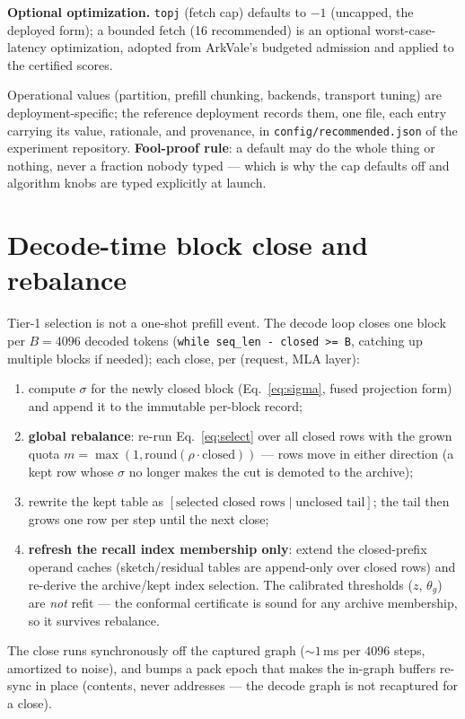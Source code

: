 \documentclass[11pt]{article}
\begin{document}
\textbf{Optional optimization.} \texttt{topj} (fetch cap) defaults to $-1$
(uncapped, the deployed form); a bounded fetch (16 recommended) is an
optional worst-case-latency optimization, adopted from ArkVale's budgeted
admission and applied to the certified scores.

Operational values (partition, prefill chunking, backends, transport tuning)
are deployment-specific; the reference deployment records them, one file,
each entry carrying its value, rationale, and provenance, in \texttt{config/recommended.json} of the
experiment repository. \textbf{Fool-proof rule}: a default may do the whole
thing or nothing, never a fraction nobody typed --- which is why the cap
defaults off and algorithm knobs are typed explicitly at launch.

\section{Decode-time block close and rebalance}\label{sec:close}

Tier-1 selection is not a one-shot prefill event. The decode loop closes one
block per $B=4096$ decoded tokens (\texttt{while seq\_len - closed >= B},
catching up multiple blocks if needed); each close, per (request, MLA layer):
\begin{enumerate}[itemsep=1pt]
\item compute $\sigma$ for the newly closed block (Eq.~\eqref{eq:sigma},
fused projection form) and append it to the immutable per-block record;
\item \textbf{global rebalance}: re-run Eq.~\eqref{eq:select} over all
$\mathrm{closed}$ rows with the grown quota $m=\max(1,\mathrm{round}(\rho\cdot\mathrm{closed}))$
--- rows move in either direction (a kept row whose $\sigma$ no longer makes
the cut is demoted to the archive);
\item rewrite the kept table as $[\text{selected closed rows} \;|\;
\text{unclosed tail}]$; the tail then grows one row per step until the next
close;
\item \textbf{refresh the recall index membership only}: extend the
closed-prefix operand caches (sketch/residual tables are append-only over
closed rows) and re-derive the archive/kept index selection. The calibrated
thresholds ($z$, $\theta_g$) are \emph{not} refit --- the conformal
certificate is sound for any archive membership, so it survives rebalance.
\end{enumerate}
The close runs synchronously off the captured graph (${\sim}1$\,ms per
$4096$ steps, amortized to noise), and bumps a pack epoch that makes the
in-graph buffers re-sync in place (contents, never addresses --- the decode
graph is not recaptured for a close).
\end{document}
